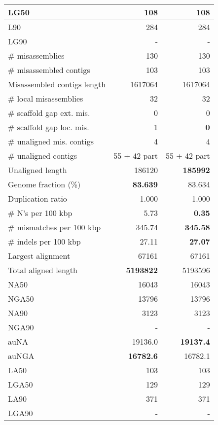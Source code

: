 \documentclass[12pt,a4paper]{article}
\begin{document}
\begin{table}[ht]
\begin{center}
\begin{tabular}{|l*{2}{|r}|}
LG50 & 108 & 108 \\ \hline
L90 & 284 & 284 \\ \hline
LG90 & - & - \\ \hline
\# misassemblies & 130 & 130 \\ \hline
\# misassembled contigs & 103 & 103 \\ \hline
Misassembled contigs length & 1617064 & 1617064 \\ \hline
\# local misassemblies & 32 & 32 \\ \hline
\# scaffold gap ext. mis. & 0 & 0 \\ \hline
\# scaffold gap loc. mis. & 1 & {\bf 0} \\ \hline
\# unaligned mis. contigs & 4 & 4 \\ \hline
\# unaligned contigs & 55 + 42 part & 55 + 42 part \\ \hline
Unaligned length & 186120 & {\bf 185992} \\ \hline
Genome fraction (\%) & {\bf 83.639} & 83.634 \\ \hline
Duplication ratio & 1.000 & 1.000 \\ \hline
\# N's per 100 kbp & 5.73 & {\bf 0.35} \\ \hline
\# mismatches per 100 kbp & 345.74 & {\bf 345.58} \\ \hline
\# indels per 100 kbp & 27.11 & {\bf 27.07} \\ \hline
Largest alignment & 67161 & 67161 \\ \hline
Total aligned length & {\bf 5193822} & 5193596 \\ \hline
NA50 & 16043 & 16043 \\ \hline
NGA50 & 13796 & 13796 \\ \hline
NA90 & 3123 & 3123 \\ \hline
NGA90 & - & - \\ \hline
auNA & 19136.0 & {\bf 19137.4} \\ \hline
auNGA & {\bf 16782.6} & 16782.1 \\ \hline
LA50 & 103 & 103 \\ \hline
LGA50 & 129 & 129 \\ \hline
LA90 & 371 & 371 \\ \hline
LGA90 & - & - \\ \hline
\end{tabular}
\end{center}
\end{table}
\end{document}
